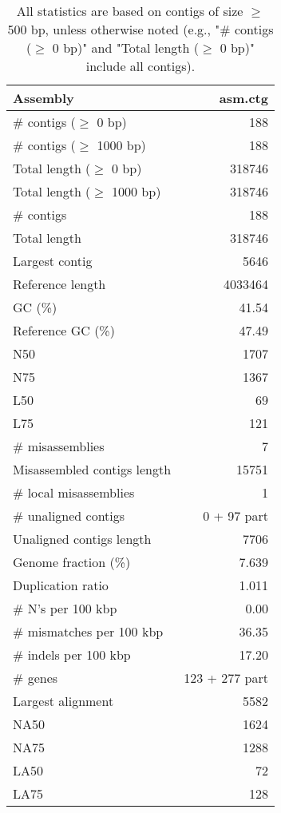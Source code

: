 \documentclass[12pt,a4paper]{article}
\begin{document}
\begin{table}[ht]
\begin{center}
\caption{All statistics are based on contigs of size $\geq$ 500 bp, unless otherwise noted (e.g., "\# contigs ($\geq$ 0 bp)" and "Total length ($\geq$ 0 bp)" include all contigs).}
\begin{tabular}{|l*{1}{|r}|}
\hline
Assembly & asm.ctg \\ \hline
\# contigs ($\geq$ 0 bp) & 188 \\ \hline
\# contigs ($\geq$ 1000 bp) & 188 \\ \hline
Total length ($\geq$ 0 bp) & 318746 \\ \hline
Total length ($\geq$ 1000 bp) & 318746 \\ \hline
\# contigs & 188 \\ \hline
Total length & 318746 \\ \hline
Largest contig & 5646 \\ \hline
Reference length & 4033464 \\ \hline
GC (\%) & 41.54 \\ \hline
Reference GC (\%) & 47.49 \\ \hline
N50 & 1707 \\ \hline
N75 & 1367 \\ \hline
L50 & 69 \\ \hline
L75 & 121 \\ \hline
\# misassemblies & 7 \\ \hline
Misassembled contigs length & 15751 \\ \hline
\# local misassemblies & 1 \\ \hline
\# unaligned contigs & 0 + 97 part \\ \hline
Unaligned contigs length & 7706 \\ \hline
Genome fraction (\%) & 7.639 \\ \hline
Duplication ratio & 1.011 \\ \hline
\# N's per 100 kbp & 0.00 \\ \hline
\# mismatches per 100 kbp & 36.35 \\ \hline
\# indels per 100 kbp & 17.20 \\ \hline
\# genes & 123 + 277 part \\ \hline
Largest alignment & 5582 \\ \hline
NA50 & 1624 \\ \hline
NA75 & 1288 \\ \hline
LA50 & 72 \\ \hline
LA75 & 128 \\ \hline
\end{tabular}
\end{center}
\end{table}
\end{document}
